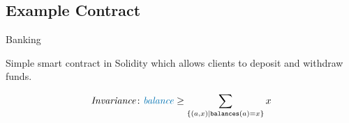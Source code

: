 \documentclass[aspectratio=169]{beamer}
\begin{document}
\subsection{Example Contract}
\begin{frame}{Banking}
\begin{tcolorbox}[colback=white,colframe=red!4,title=\textcolor{red}{Specification:}]
\begin{center} 
Simple smart contract in Solidity which allows clients to deposit and withdraw funds.
\end{center}
\end{tcolorbox} 
%
\begin{tcolorbox}[colback=white,colframe=red!4,title=\textcolor{red}{Property:}]
	\begin{align*}
		\mathit{Invariance}\colon&\mathit{\color{blue}balance} \geq \sum_{\{(a,x)|\texttt{balances}(a)=x\}} x\\
	\end{align*}
\end{tcolorbox} 
\end{frame}
%
\end{document}
